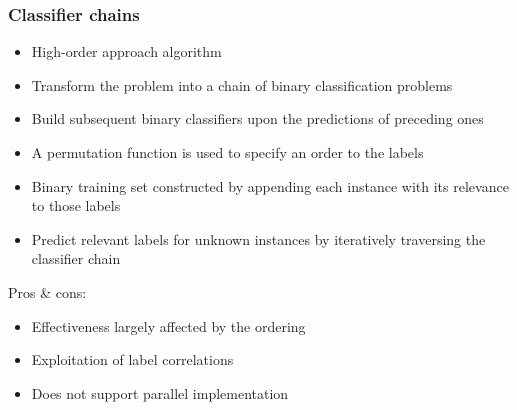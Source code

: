 \documentclass{beamer}
\begin{document}
\begin{frame}
\frametitle{Classifier chains}
\begin{itemize}
	\item High-order approach algorithm
	\item Transform the problem into a chain of binary classification problems
	\item Build subsequent binary classifiers upon the predictions of preceding ones
	\item A permutation function is used to specify an order to the labels
	\item Binary training set
constructed by appending each instance with its relevance
to those labels
	\item Predict relevant labels for unknown instances by iteratively traversing the classifier chain
\end{itemize}

Pros \& cons:
\begin{itemize}
	\item Effectiveness largely affected by the ordering
	\item Exploitation of label correlations
	\item Does not support parallel implementation
\end{itemize}
\end{frame}
\end{document}
